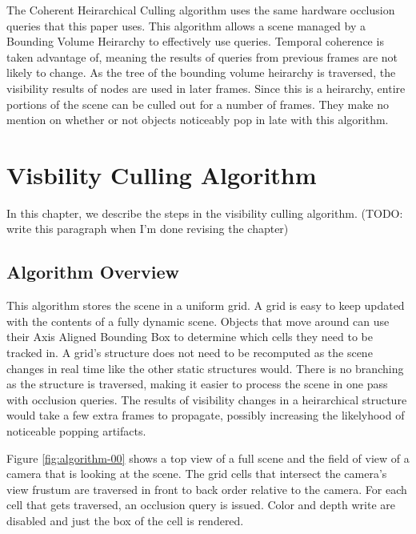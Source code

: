 \documentclass[12pt]{ucthesis}
\begin{document}
The Coherent Heirarchical Culling algorithm uses the same hardware occlusion queries that this paper uses.\cite{CHC, CHCpp}
This algorithm allows a scene managed by a Bounding Volume Heirarchy to effectively use queries.
Temporal coherence is taken advantage of, meaning the results of queries from previous frames are not likely to change.
As the tree of the bounding volume heirarchy is traversed, the visibility results of nodes are used in later frames.
Since this is a heirarchy, entire portions of the scene can be culled out for a number of frames.
They make no mention on whether or not objects noticeably pop in late with this algorithm.

\chapter{Visbility Culling Algorithm}
\label{visibility-culling-algorithm}

In this chapter, we describe the steps in the visibility culling algorithm. (TODO: write this paragraph when I'm done revising the chapter)

\section{Algorithm Overview}
\label{algorithm-overview}

This algorithm stores the scene in a uniform grid.
A grid is easy to keep updated with the contents of a fully dynamic scene.
Objects that move around can use their Axis Aligned Bounding Box to determine which cells they need to be tracked in.
A grid's structure does not need to be recomputed as the scene changes in real time like the other static structures would.
There is no branching as the structure is traversed, making it easier to process the scene in one pass with occlusion queries.
The results of visibility changes in a heirarchical structure would take a few extra frames to propagate, possibly increasing the likelyhood of noticeable popping artifacts.

Figure \ref{fig:algorithm-00} shows a top view of a full scene and the field of view of a camera that is looking at the scene.
The grid cells that intersect the camera's view frustum are traversed in front to back order relative to the camera.
For each cell that gets traversed, an occlusion query is issued.
Color and depth write are disabled and just the box of the cell is rendered.
\end{document}
